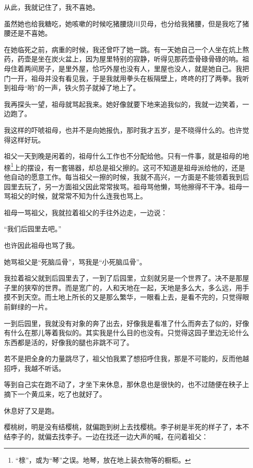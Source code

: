 \par 从此，我就记住了，我不喜她。
\par 虽然她也给我糖吃，她咳嗽的时候吃猪腰烧川贝母，也分给我猪腰，但是我吃了猪腰还是不喜她。
\par 在她临死之前，病重的时候，我还曾吓了她一跳。有一天她自己一个人坐在炕上熬药，药壶是坐在炭火盆上，因为屋里特别的寂静，听得见那药壶骨碌骨碌的响。祖母住着两间房子，是里外屋，恰巧外屋也没有人，里屋也没人，就是她自己。我把门一开，祖母并没有看见我，于是我就用拳头在板隔壁上，咚咚的打了两拳。我听到祖母“哟”的一声，铁火剪子就掉了地上了。
\par 我再探头一望，祖母就骂起我来。她好像就要下地来追我似的，我就一边笑着，一边跑了。
\par 我这样的吓唬祖母，也并不是向她报仇，那时我才五岁，是不晓得什么的。也许觉得这样好玩。
\par 祖父一天到晚是闲着的，祖母什么工作也不分配给他。只有一件事，就是祖母的地榇\footnote{“榇”，或为“琴”之误。地琴，放在地上装衣物等的橱柜。}上的摆设，有一套锡器，却总是祖父擦的。这可不知道是祖母派给他的，还是他自动的愿意工作。每当祖父一擦的时候，我就不高兴，一方面是不能领着我到后园里去玩了，另一方面祖父因此常常挨骂。祖母骂他懒，骂他擦得不干净。祖母一骂祖父的时候，就常常不知为什么连我也骂上。
\par 祖母一骂祖父，我就拉着祖父的手往外边走，一边说：
\par “我们后园里去吧。”
\par 也许因此祖母也骂了我。
\par 她骂祖父是“死脑瓜骨”，骂我是“小死脑瓜骨”。
\par 我拉着祖父就到后园里去了，一到了后园里，立刻就另是一个世界了。决不是那屋子里的狭窄的世界。而是宽广的，人和天地在一起，天地是多么大，多么远，用手摸不到天空。而土地上所长的又是那么繁华，一眼看上去，是看不完的，只觉得眼前鲜绿的一片。
\par 一到后园里，我就没有对象的奔了出去，好像我是看准了什么而奔去了似的，好像有什么在那儿等着我似的。其实我是什么目的也没有。只觉得这园子里边无论什么东西都是活的，好像我的腿也非跳不可了。
\par 若不是把全身的力量跳尽了，祖父怕我累了想招呼住我，那是不可能的，反而他越招呼，我越不听话。
\par 等到自己实在跑不动了，才坐下来休息，那休息也是很快的，也不过随便在秧子上摘下一个黄瓜来，吃了也就好了。
\par 休息好了又是跑。
\par 樱桃树，明是没有结樱桃，就偏跑到树上去找樱桃。李子树是半死的样子了，本不结李子的，就偏去找李子。一边在找还一边大声的喊，在问着祖父：
